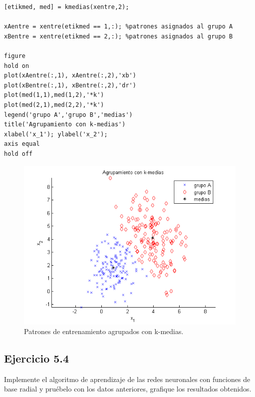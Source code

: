 \documentclass[11pt,a4paper,final]{article}
\begin{document}
\begin{verbatim}
[etikmed, med] = kmedias(xentre,2);

xAentre = xentre(etikmed == 1,:); %patrones asignados al grupo A
xBentre = xentre(etikmed == 2,:); %patrones asignados al grupo B

figure
hold on
plot(xAentre(:,1), xAentre(:,2),'xb')
plot(xBentre(:,1), xBentre(:,2),'dr')
plot(med(1,1),med(1,2),'*k')
plot(med(2,1),med(2,2),'*k')
legend('grupo A','grupo B','medias')
title('Agrupamiento con k-medias')
xlabel('x_1'); ylabel('x_2');
axis equal
hold off
\end{verbatim}

\begin{figure}
\includegraphics [width=\textwidth]{Ejercicio5_03.png}
\caption{Patrones de entrenamiento agrupados con k-medias.}
\label{fig:ejercicio53}
\end{figure}


\subsection{Ejercicio 5.4}


Implemente el algoritmo de aprendizaje de las redes neuronales con funciones de base radial y pruébelo con los datos anteriores, grafique los resultados obtenidos.
\end{document}
